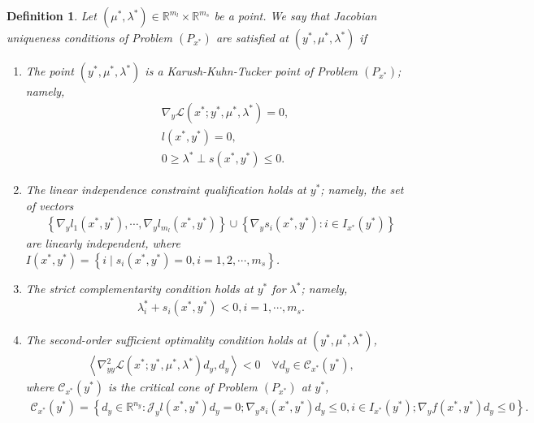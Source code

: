 \documentclass{article}
\newtheorem{definition}{Definition}
\begin{document}
	\begin{definition}
		Let $(\mu^{\ast}, \lambda^{\ast}) \in \mathbb{R}^{m_{l}} \times \mathbb{R}^{m_{s}}$ be a point. We say that Jacobian uniqueness conditions of Problem $(P_{x^{\ast}})$ are satisfied at $(y^{\ast}, \mu^{\ast}, \lambda^{\ast})$ if
		\begin{enumerate}
			\item The point $(y^{\ast}, \mu^{\ast}, \lambda^{\ast})$ is a Karush-Kuhn-Tucker point of Problem $(P_{x^{\ast}})$; namely,
			\begin{align*}
				& \nabla_{y} \mathcal{L}(x^{\ast}; y^{\ast}, \mu^{\ast}, \lambda^{\ast}) = 0,\\
				& l(x^{\ast}, y^{\ast}) = 0,\\
				& 0 \geq \lambda^{\ast} \perp s(x^{\ast}, y^{\ast}) \leq 0.
			\end{align*}
			\item The linear independence constraint qualification holds at $y^{\ast}$; namely, the set of vectors
			\begin{align*}
				\left\lbrace \nabla_{y}l_{1}(x^{\ast}, y^{\ast}), \cdots, \nabla_{y}l_{m_{l}}(x^{\ast}, y^{\ast})\right\rbrace \cup \left\lbrace\nabla_{y}s_{i}(x^{\ast}, y^{\ast}) : i\in I_{x^{\ast}}(y^{\ast})\right\rbrace
			\end{align*}
			are linearly independent, where $I(x^{\ast}, y^{\ast}) = \left\lbrace i \mid s_{i}(x^{\ast}, y^{\ast}) = 0, i = 1, 2, \cdots, m_{s}\right\rbrace$.
			\item The strict complementarity condition holds at $y^{\ast}$ for $\lambda^{\ast}$; namely,
			\begin{align*}
				\lambda_{i}^{\ast} + s_{i}(x^{\ast}, y^{\ast}) < 0, i = 1, \cdots, m_{s}. 
			\end{align*}
			\item The second-order sufficient optimality condition holds at $(y^{\ast}, \mu^{\ast}, \lambda^{\ast})$,
			\begin{align*}
				\left\langle \nabla_{yy}^{2}\mathcal{L}(x^{\ast}; y^{\ast}, \mu^{\ast}, \lambda^{\ast})d_{y}, d_{y}\right\rangle < 0 \quad \forall d_{y}\in \mathcal{C}_{x^{\ast}}(y^{\ast}),
			\end{align*}
			where $\mathcal{C}_{x^{\ast}}(y^{\ast})$ is the critical cone of Problem $(P_{x^{\ast}})$ at $y^{\ast}$,
			\begin{align*}
				\mathcal{C}_{x^{\ast}}(y^{\ast}) = \left\lbrace d_{y} \in \mathbb{R}^{n_{y}} : \mathcal{J}_{y}l(x^{\ast}, y^{\ast})d_{y} = 0; \nabla_{y}s_{i}(x^{\ast}, y^{\ast})d_{y} \leq 0, i\in I_{x^{\ast}}(y^{\ast}); \nabla_{y} f(x^{\ast}, y^{\ast})d_{y} \leq 0\right\rbrace.
			\end{align*}
		\end{enumerate}
	\end{definition}
	
\end{document}
